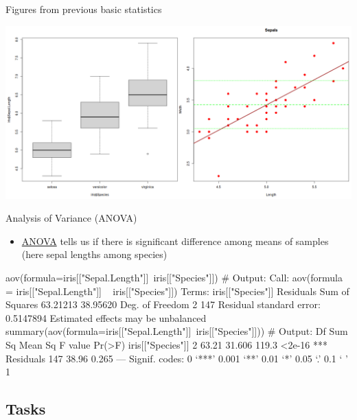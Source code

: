 \documentclass[compress, xelatex, 11pt, xcolor=svgnames, aspectratio=169,
	hyperref={
		bookmarks=true,
		unicode=true,
		colorlinks=true,
		pdftitle={Molecular data in R},
		plainpages=false,
		pdfauthor={Vojtech Zeisek},
		pdfsubject={Course about phylogeny and evolution in R},
		pdfcreator={XeLaTeX},
		pdfkeywords={R, evolution, phylogeny, molecular data},
		linkcolor=Crimson, %
		anchorcolor=Magenta, %
		citecolor=Magenta, %
		filecolor=Magenta, %
		menucolor=Magenta, %
		urlcolor=DodgerBlue, %
		},
	url={hyphens, lowtilde} %
	]{beamer}
\begin{document}
\begin{frame}{Figures from previous basic statistics}
	\begin{center}
		\includegraphics[width=\textwidth-2cm]{iris.png}
	\end{center}
\end{frame}

\begin{frame}[fragile]{Analysis of Variance (ANOVA)}
	\begin{itemize}
		\item \href{https://en.wikipedia.org/wiki/Analysis_of_variance}{ANOVA} tells us if there is significant difference among means of samples (here sepal lengths among species)
	\end{itemize}
	\begin{spluscode}
    aov(formula=iris[["Sepal.Length"]]~iris[["Species"]]) # Output:
    Call:
       aov(formula = iris[["Sepal.Length"]] ~ iris[["Species"]])
    Terms:
                    iris[["Species"]] Residuals
    Sum of Squares           63.21213  38.95620
    Deg. of Freedom                 2       147
    Residual standard error: 0.5147894
    Estimated effects may be unbalanced
    summary(aov(formula=iris[["Sepal.Length"]]~iris[["Species"]])) # Output:
                       Df Sum Sq Mean Sq F value Pr(>F)    
    iris[["Species"]]   2  63.21  31.606   119.3 <2e-16 ***
    Residuals         147  38.96   0.265                   
    ---
    Signif. codes:  0 ‘***’ 0.001 ‘**’ 0.01 ‘*’ 0.05 ‘.’ 0.1 ‘ ’ 1
	\end{spluscode}
\end{frame}

\subsection{Tasks}
\end{document}
